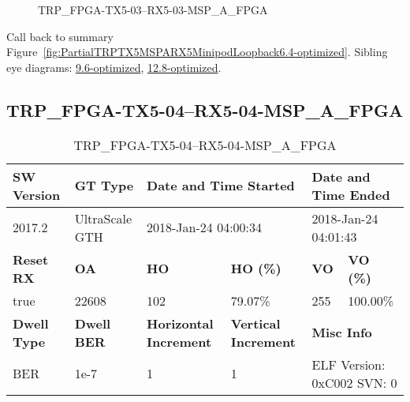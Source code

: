 \begin{figure}[h]
\caption{TRP\_FPGA-TX5-03--RX5-03-MSP\_A\_FPGA} \label{fig:TRPFPGATX503RX503MSPAFPGA6.4-optimized}
\end{figure}

Call back to summary Figure~\ref{fig:PartialTRPTX5MSPARX5MinipodLoopback6.4-optimized}.
Sibling eye diagrams: \hyperref[sec:TRPFPGATX503RX503MSPAFPGA9.6-optimized]{9.6-optimized}, \hyperref[sec:TRPFPGATX503RX503MSPAFPGA12.8-optimized]{12.8-optimized}.

\clearpage
\newpage


\subsection{TRP\_FPGA-TX5-04--RX5-04-MSP\_A\_FPGA}\label{sec:TRPFPGATX504RX504MSPAFPGA6.4-optimized}

\begin{table}[h]
\centering
\caption{TRP\_FPGA-TX5-04--RX5-04-MSP\_A\_FPGA}
\label{tab:TRPFPGATX504RX504MSPAFPGA6.4-optimized}
\begin{tabular}{@{}|l|l|l|l|l|l|@{}}
\toprule
\textbf{SW Version}                & \textbf{GT Type}   & \multicolumn{2}{l|}{\textbf{Date and Time Started}}            & \multicolumn{2}{l|}{\textbf{Date and Time Ended}}        \\ \midrule
2017.2                       & UltraScale GTH          & \multicolumn{2}{l|}{2018-Jan-24 04:00:34}                   & \multicolumn{2}{l|}{2018-Jan-24 04:01:43}               \\ \midrule
\textbf{Reset RX}                  & \textbf{OA} & \textbf{HO}   & \textbf{HO (\%)} & \textbf{VO} & \textbf{VO (\%)} \\ \midrule
true & 22608        & 102          & 79.07\%        & 255        & 100.00\%       \\ \midrule
\textbf{Dwell Type}                & \textbf{Dwell BER} & \textbf{Horizontal Increment} & \textbf{Vertical Increment}    & \multicolumn{2}{l|}{\textbf{Misc Info}}                  \\ \midrule
BER                            & 1e-7        & 1        & 1           & \multicolumn{2}{l|}{ELF Version: 0xC002 SVN: 0}                         \\ \bottomrule
\end{tabular}
\end{table}

